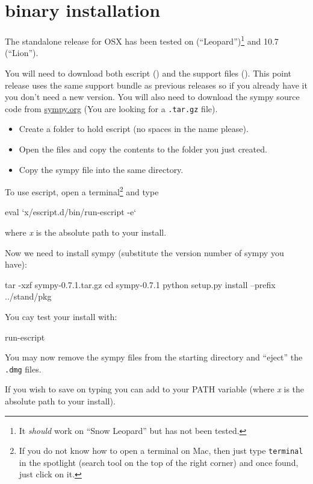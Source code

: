 %
%
%

\section{\macosx binary installation}
\label{sec:binmac}

The standalone release for OSX has been tested on  (``Leopard'')\footnote{It \emph{should} work on 
``Snow Leopard'' but has not been tested.} and 10.7 (``Lion'').

You will need to download both escript () and the support files ().
This point release uses the same support bundle as previous releases so if you already have it you don't need a new version.
You will also need to download the sympy source code from \url{sympy.org} (You are looking for a \texttt{.tar.gz} file).

\begin{itemize}
\item Create a folder to hold escript (no spaces in the name please).
\item Open the  files and copy the contents to the folder you just created.
\item Copy the sympy file into the same directory.
\end{itemize}

To use escript, open a terminal\footnote{If you do not know how to open a terminal on Mac, then just type \texttt{terminal} in the spotlight (search tool on the top of the right corner) and once found, just click on it.} and type
\begin{shellCode}
eval `x/escript.d/bin/run-escript -e`
\end{shellCode}
where \textit{x} is the absolute path to your install.

\noindent Now we need to install sympy (substitute the version number of sympy you have):
\begin{shellCode}
tar -xzf sympy-0.7.1.tar.gz
cd sympy-0.7.1
python setup.py install --prefix ../stand/pkg
\end{shellCode}

You cay test your install with:
\begin{shellCode}
run-escript
\end{shellCode}

You may now remove the sympy files from the starting directory and ``eject'' the \texttt{.dmg} files.

If you wish to save on typing you can add  to your PATH variable 
(where \textit{x} is the absolute path to your install). 

